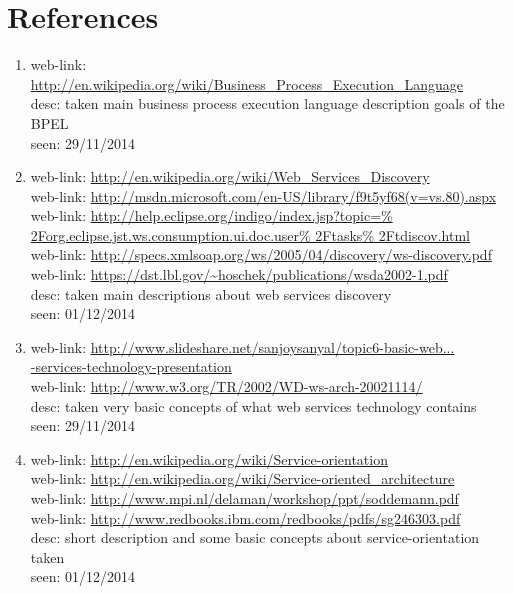 \section{References}
\par{
\begin{enumerate}
\item \label{BPEL description} web-link: \url{http://en.wikipedia.org/wiki/Business_Process_Execution_Language} \\ desc: taken main business process execution language description goals of the BPEL \\ seen: 29/11/2014
\item \label{Web Services Discovery} web-link: \url{http://en.wikipedia.org/wiki/Web_Services_Discovery}  \\ 
web-link: \url{http://msdn.microsoft.com/en-US/library/f9t5yf68(v=vs.80).aspx}  \\
web-link: \url{http://help.eclipse.org/indigo/index.jsp?topic=\% 2Forg.eclipse.jst.ws.consumption.ui.doc.user\% 2Ftasks\% 2Ftdiscov.html}  \\ 
web-link: \url{http://specs.xmlsoap.org/ws/2005/04/discovery/ws-discovery.pdf}  \\
web-link: \url{https://dst.lbl.gov/~hoschek/publications/wsda2002-1.pdf}  \\
desc: taken main descriptions about web services discovery  \\ seen: 01/12/2014 \\
\item \label{Basic Web Services Technology}  web-link: \url{http://www.slideshare.net/sanjoysanyal/topic6-basic-web...}\\ \url{-services-technology-presentation}  \\ 
web-link: \url{http://www.w3.org/TR/2002/WD-ws-arch-20021114/}  \\ desc: taken very basic concepts of what web services technology contains  \\ seen: 29/11/2014  \\
\item \label{Services Orientation} web-link: \url{http://en.wikipedia.org/wiki/Service-orientation}  \\ 
web-link: \url{http://en.wikipedia.org/wiki/Service-oriented_architecture}  \\ 
web-link: \url{http://www.mpi.nl/delaman/workshop/ppt/soddemann.pdf}  \\ 
web-link: \url{http://www.redbooks.ibm.com/redbooks/pdfs/sg246303.pdf}  \\ desc: short description and some basic concepts about service-orientation taken  \\ seen: 01/12/2014  \\

\end{enumerate}}
